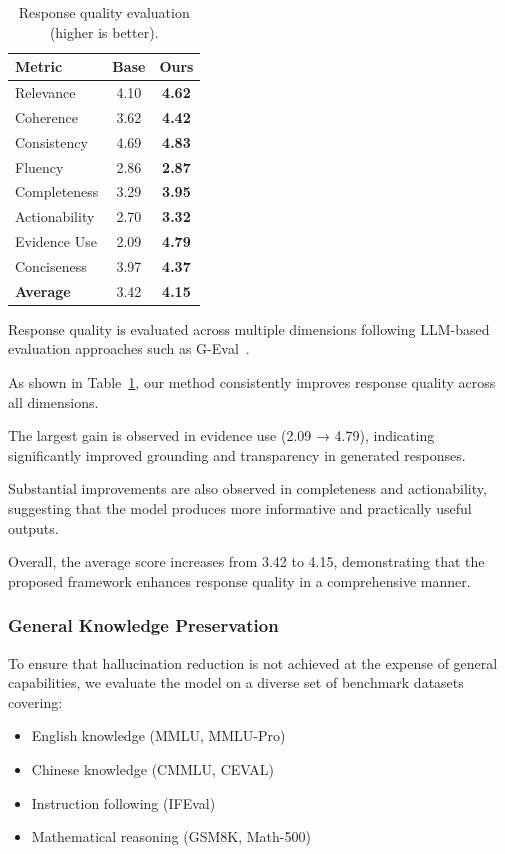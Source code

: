 \begin{table}[h]
\centering
\caption{Response quality evaluation (higher is better).}
\label{tab:response_quality}
\begin{tabular}{lcc}
\toprule
Metric & Base & Ours \\
\midrule
Relevance & 4.10 & \textbf{4.62} \\
Coherence & 3.62 & \textbf{4.42} \\
Consistency & 4.69 & \textbf{4.83} \\
Fluency & 2.86 & \textbf{2.87} \\
Completeness & 3.29 & \textbf{3.95} \\
Actionability & 2.70 & \textbf{3.32} \\
Evidence Use & 2.09 & \textbf{4.79} \\
Conciseness & 3.97 & \textbf{4.37} \\
\midrule
\textbf{Average} & 3.42 & \textbf{4.15} \\
\bottomrule
\end{tabular}
\end{table}

Response quality is evaluated across multiple dimensions following LLM-based evaluation approaches such as G-Eval~\cite{geval}.

As shown in Table~\ref{tab:response_quality}, our method consistently improves response quality across all dimensions.

The largest gain is observed in evidence use (2.09 → 4.79), indicating significantly improved grounding and transparency in generated responses.

Substantial improvements are also observed in completeness and actionability, suggesting that the model produces more informative and practically useful outputs.

Overall, the average score increases from 3.42 to 4.15, demonstrating that the proposed framework enhances response quality in a comprehensive manner.

\subsubsection{General Knowledge Preservation}

To ensure that hallucination reduction is not achieved at the expense of general capabilities,
we evaluate the model on a diverse set of benchmark datasets covering:

\begin{itemize}
    \item English knowledge (MMLU, MMLU-Pro)
    \item Chinese knowledge (CMMLU, CEVAL)
    \item Instruction following (IFEval)
    \item Mathematical reasoning (GSM8K, Math-500)
\end{itemize}

